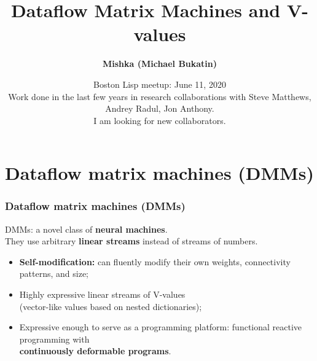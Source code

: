 \documentclass{beamer}
\newcommand{\msmagenta}[1]{{\color{mymagenta} #1}}
\begin{document}
\title{Dataflow Matrix Machines and V-values}
\author{\bf Mishka (Michael Bukatin)}
\date[]  
{Boston Lisp meetup: June 11, 2020\\[2ex]
Work done in the last few  years
in research collaborations with Steve Matthews, Andrey Radul, Jon Anthony.\\[2ex]
I am looking for new collaborators.
}

\begin{frame}
  \initclock
  \titlepage
\end{frame}

\section{Dataflow matrix machines (DMMs)}

\begin{frame}

  \frametitle{\msmagenta{Dataflow matrix machines (DMMs)}}

DMMs: a novel class of {\bf neural machines}.\\[2ex]

They use arbitrary {\bf linear streams} instead of streams of numbers.\\[2ex]


\begin{itemize}

\item {\bf Self-modification:} can fluently modify their own weights, connectivity patterns, and size;\\[2ex]

\item Highly expressive linear streams of V-values\\ (vector-like values based on nested dictionaries);\\[2ex]

\item Expressive enough to serve as a programming platform: functional reactive programming with\\ {\bf continuously deformable programs}.

\end{itemize}

\end{frame}
\end{document}
